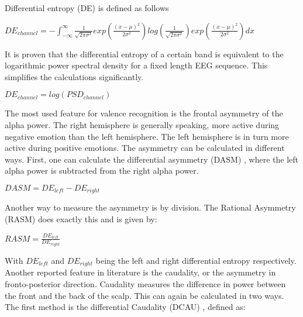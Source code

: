 \npar

Differential entropy (DE) is defined as follows \citep{killyPaper} \\
\begin{center}
$DE_{channel} = - \int_{-\infty}^{\infty} \frac{1}{\sqrt{2\pi\sigma^2}} exp(\frac{(x-\mu)^2}{2\sigma^2}) log(\frac{1}{\sqrt{2\pi\sigma^2}}) exp(\frac{(x-\mu)^2}{2\sigma^2})dx$
\end{center}
It is proven that the differential entropy of a certain band is equivalent to the logarithmic power spectral density for a fixed length EEG sequence\citep{diffEnt}. This simplifies the calculations significantly.
\begin{center}
$DE_{channel} = log(PSD_{channel})$
\end{center}

\npar

The most used feature for valence recognition is the frontal asymmetry of the alpha power\cite{GivenPaper}. The right hemisphere is generally speaking, more active during negative emotion than the left hemisphere. The left hemisphere is in turn more active during positive emotions\cite{RealTimeEEGEmotion,EEGDatasets,killyPaper}. The asymmetry can be calculated in different ways. First, one can calculate the differential asymmetry (DASM) , where the left alpha power is subtracted from the right alpha power.

\begin{center}
$DASM = DE_{left} - DE_{right}$
\end{center}

Another way to measure the asymmetry is by division. The Rational Asymmetry (RASM)  does exactly this and is given by: \\

\begin{center}
$RASM = \frac{DE_{left}}{DE_{right}}$
\end{center}

With $DE_{left}$ and $DE_{right}$ being the left and right differential entropy respectively. Another reported feature in literature is the caudality, or the asymmetry in fronto-posterior direction\cite{caudality}. Caudality measures the difference in power between the front and the back of the scalp. This can again be calculated in two ways. The first method is the differential Caudality (DCAU) , defined as: \\

